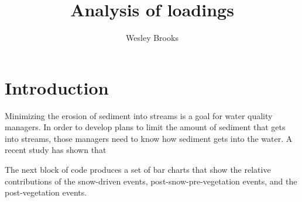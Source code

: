\documentclass[12pt]{article}
\title{Analysis of loadings}
\author{Wesley Brooks}
\date{}                                           %
\begin{document}
\maketitle


\section{Introduction}
Minimizing the erosion of sediment into streams is a goal for water quality managers. In order to develop plans to limit the amount of sediment that gets into streams, those managers need to know how sediment gets into the water. A recent study \cite{Danz:2010} has shown that 

The next block of code produces a set of bar charts that show the relative contributions of the snow-driven events, post-snow-pre-vegetation events, and the post-vegetation events.\\
\end{document}
